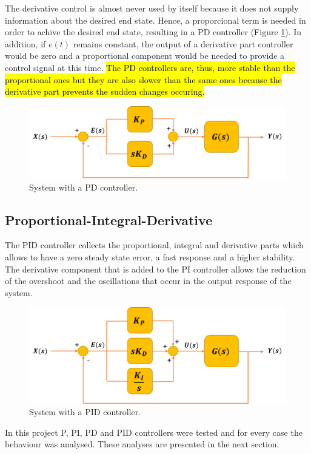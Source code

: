 The derivative control is almost never used by itself because it does not supply information about the desired end state. Hence, a proporcional term is needed in order to achive the desired end state, resulting in a PD controller (Figure \ref{PD_controller}). In addition, if $e(t)$ remains constant, the output of a derivative part controller would be zero and a proportional component would be needed to provide a control signal at this time. \hl{The PD controllers are, thus, more stable than the proportional ones but they are also slower than the same ones because the derivative part prevents the sudden changes occuring.}

\begin{figure}[H]
	\centering
	\includegraphics[scale=0.6]{figures/PD_controller.png}
	\caption{System with a PD controller.}
	\label{PD_controller}
\end{figure}

\subsection*{Proportional-Integral-Derivative}

The PID controller collects the proportional, integral and derivative parts which allows to have a zero steady state error, a fast response and a higher stability. The derivative component that is added to the PI controller allows the reduction of the overshoot and the oscillations that occur in the output response of the system. 

\begin{figure}[H]
	\centering
	\includegraphics[scale=0.6]{figures/PID_controller.png}
	\caption{System with a PID controller.}
	\label{PID_controller}
\end{figure}

In this project P, PI, PD and PID controllers were tested and for every case the behaviour was analysed. These analyses are presented in the next section.